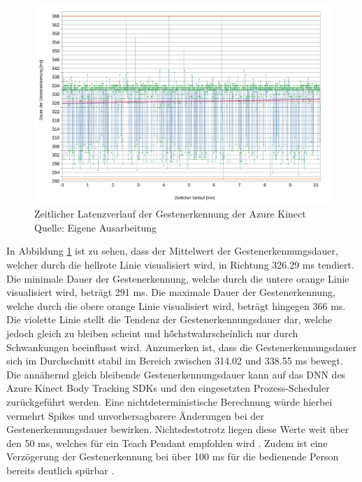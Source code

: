 \begin{figure}[htb]
	\centering
	\includegraphics[width=1.04\textwidth]{images/ergebnisse/dauer_der_gestenerkennung_verlauf}
	\caption[Zeitlicher Latenzverlauf der Gestenerkennung der Azure Kinect]{Zeitlicher Latenzverlauf der Gestenerkennung der Azure Kinect\\Quelle: Eigene Ausarbeitung}
	\label{fig:measurement_gesture_recognition_azure_kinect}
\end{figure}
\FloatBarrier

In Abbildung \ref{fig:measurement_gesture_recognition_azure_kinect} ist zu sehen, dass der Mittelwert der Gestenerkennungsdauer, welcher durch die hellrote Linie visualisiert wird, in Richtung \num{326,29} ms tendiert. Die minimale Dauer der Gestenerkennung, welche durch die untere orange Linie visualisiert wird, beträgt \num{291} ms. Die maximale Dauer der Gestenerkennung, welche durch die obere orange Linie visualisiert wird, beträgt hingegen \num{366} ms. Die violette Linie stellt die Tendenz der Gestenerkennungsdauer dar, welche jedoch gleich zu bleiben scheint und hö́chstwahrscheínlich nur durch Schwankungen beeinflusst wird. Anzumerken ist, dass die Gestenerkennungsdauer sich im Durchschnitt stabil im Bereich zwischen \num{314,02} und \num{338,55} ms bewegt. Die annähernd gleich bleibende Gestenerkennungsdauer kann auf das DNN des Azure Kinect Body Tracking SDKs und den eingesetzten Prozess-Scheduler zurückgeführt werden. Eine nichtdeterministische Berechnung würde hierbei vermehrt Spikes und unvorhersagbarere Änderungen bei der Gestenerkennungsdauer bewirken. Nichtsdestotrotz liegen diese Werte weit über den 50 ms, welches für ein Teach Pendant empfohlen wird \cite[55]{prassler_advances_2004}. Zudem ist eine Verzögerung der Gestenerkennung bei über 100 ms für die bedienende Person bereits deutlich spürbar \cite{miller_response_1968}.

